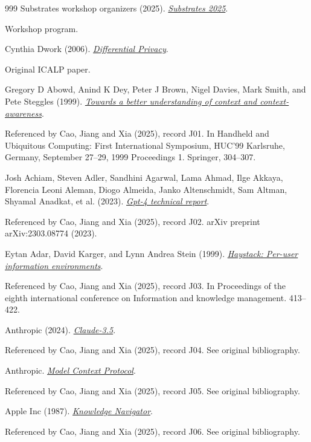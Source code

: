 \documentclass[11pt,letterpaper]{article}
\begin{document}
\begin{thebibliography}{999}
Substrates workshop organizers (2025).
\href{https://2025.programming-conference.org/home/substrates-2025}{\emph{Substrates 2025}}.
\par {\small Workshop program.}

Cynthia Dwork (2006).
\href{https://dwork.seas.harvard.edu/publications/differential-privacy}{\emph{Differential Privacy}}.
\par {\small Original ICALP paper.}

Gregory D Abowd, Anind K Dey, Peter J Brown, Nigel Davies, Mark Smith, and Pete Steggles (1999).
\href{https://kar.kent.ac.uk/17006/}{\emph{Towards a better understanding of context and context-awareness}}.
\par {\small Referenced by Cao, Jiang and Xia (2025), record J01. In Handheld and Ubiquitous Computing: First International Symposium, HUC’99 Karlsruhe, Germany, September 27–29, 1999 Proceedings 1. Springer, 304–307.}

Josh Achiam, Steven Adler, Sandhini Agarwal, Lama Ahmad, Ilge Akkaya, Florencia Leoni Aleman, Diogo Almeida, Janko Altenschmidt, Sam Altman, Shyamal Anadkat, et al. (2023).
\href{https://arxiv.org/abs/2303.08774}{\emph{Gpt-4 technical report}}.
\par {\small Referenced by Cao, Jiang and Xia (2025), record J02. arXiv preprint arXiv:2303.08774 (2023).}

Eytan Adar, David Karger, and Lynn Andrea Stein (1999).
\href{https://haystack.csail.mit.edu/papers/cikm99.pdf}{\emph{Haystack: Per-user information environments}}.
\par {\small Referenced by Cao, Jiang and Xia (2025), record J03. In Proceedings of the eighth international conference on Information and knowledge management. 413–422.}

Anthropic (2024).
\href{https://www.anthropic.com}{\emph{Claude-3.5}}.
\par {\small Referenced by Cao, Jiang and Xia (2025), record J04. See original bibliography.}

Anthropic.
\href{https://www.anthropic.com/news/model-context-protocol}{\emph{Model Context Protocol}}.
\par {\small Referenced by Cao, Jiang and Xia (2025), record J05. See original bibliography.}

Apple Inc (1987).
\href{https://arxiv.org/html/2503.04084v1\#bib.bib7}{\emph{Knowledge Navigator}}.
\par {\small Referenced by Cao, Jiang and Xia (2025), record J06. See original bibliography.}


\end{thebibliography}
\end{document}
